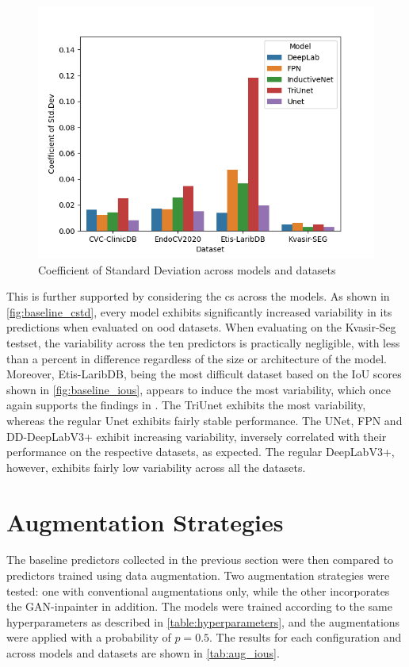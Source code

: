     \begin{figure}[h]
        \centering
        \includegraphics[width=\linewidth]{illustrations/cstd_baseline.png}
        \caption{Coefficient of Standard Deviation across models and datasets}
        \label{fig:baseline_cstd}
    \end{figure}
    
    This is further supported by considering the \gls{cs} across the models. As shown in \autoref{fig:baseline_cstd}, every model exhibits significantly increased variability in its predictions when evaluated on \gls{ood} datasets. When evaluating on the Kvasir-Seg testset, the variability across the ten predictors is practically negligible, with less than a percent in difference regardless of the size or architecture of the model. Moreover, Etis-LaribDB, being the most difficult dataset based on the IoU scores shown in \autoref{fig:baseline_ious}, appears to induce the most variability, which once again supports the findings in \cite{damour2020underspecification}. The TriUnet exhibits the most variability, whereas the regular Unet exhibits fairly stable performance. The UNet, FPN and DD-DeepLabV3+ exhibit increasing variability, inversely correlated with their performance on the respective datasets, as expected. The regular DeepLabV3+, however, exhibits fairly low variability across all the datasets. %
    
    
\section{Augmentation Strategies}
The baseline predictors collected in the previous section were then compared to predictors trained using data augmentation. Two augmentation strategies were tested: one with conventional augmentations only, while the other incorporates the GAN-inpainter in addition. The models were trained according to the same hyperparameters as described in \autoref{table:hyperparameters}, and the augmentations were applied with a probability of \(p=0.5\). The results for each configuration and across models and datasets are shown in \autoref{tab:aug_ious}.

